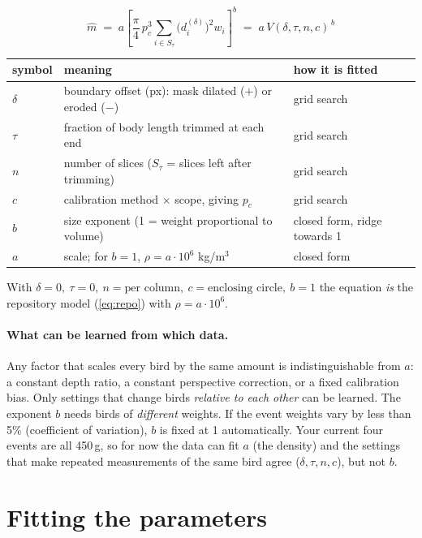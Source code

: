 \documentclass[11pt,a4paper]{article}
\begin{document}
\begin{keybox}
\[
  \boxed{\;\hat m \;=\; a\left[\frac{\pi}{4}\,p_c^{3}\sum_{i\in S_\tau}\Big(d_i^{(\delta)}\Big)^{2} w_i\right]^{b} \;=\; a\,V(\delta,\tau,n,c)^{\,b}\;}
\]
\begin{tabular}{@{}l>{\raggedright\arraybackslash}p{8.6cm}>{\raggedright\arraybackslash}p{4.2cm}@{}}
\toprule
symbol & meaning & how it is fitted\\
\midrule
$\delta$ & boundary offset (px): mask dilated ($+$) or eroded ($-$) & grid search\\
$\tau$ & fraction of body length trimmed at each end & grid search\\
$n$ & number of slices ($S_\tau$ = slices left after trimming) & grid search\\
$c$ & calibration method $\times$ scope, giving $p_c$ & grid search\\
$b$ & size exponent (1 = weight proportional to volume) & closed form, ridge towards 1\\
$a$ & scale; for $b=1$, $\rho = a\cdot10^{6}$ kg/m$^3$ & closed form\\
\bottomrule
\end{tabular}
\end{keybox}

With $\delta=0,\ \tau=0,\ n=\text{per column},\ c=\text{enclosing circle},\ b=1$ the equation \emph{is} the repository model (\ref{eq:repo}) with $\rho=a\cdot10^6$.

\paragraph{What can be learned from which data.} Any factor that scales every bird by the same amount is indistinguishable from $a$: a constant depth ratio, a constant perspective correction, or a fixed calibration bias. Only settings that change birds \emph{relative to each other} can be learned. The exponent $b$ needs birds of \emph{different} weights. If the event weights vary by less than 5\% (coefficient of variation), $b$ is fixed at 1 automatically. Your current four events are all 450\,g, so for now the data can fit $a$ (the density) and the settings that make repeated measurements of the same bird agree ($\delta,\tau,n,c$), but not $b$.

\section{Fitting the parameters}
\end{document}
